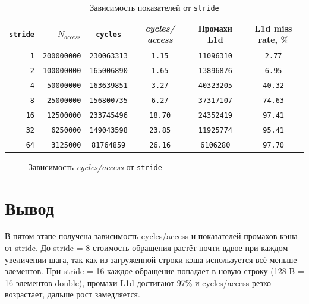 \begin{table}[H]
\caption{Зависимость показателей от \texttt{stride}}
\label{tab:stride}
\small
\begin{tabularx}{\textwidth}{|r|r|C|C|C|C|}
	\hline
	\texttt{stride} & $N_{access}$ & \texttt{cycles} & \textit{cycles/ access} & Промахи L1d & L1d miss rate, \% \\
	\hline
	\texttt{1} & \texttt{200000000} & \texttt{230063313} & \texttt{1.15} & \texttt{11096310} & \texttt{2.77} \\
	\hline
	\texttt{2} & \texttt{100000000} & \texttt{165006890} & \texttt{1.65} & \texttt{13896876} & \texttt{6.95} \\
	\hline
	\texttt{4} & \texttt{50000000} & \texttt{163639851} & \texttt{3.27} & \texttt{40323205} & \texttt{40.32} \\
	\hline
	\texttt{8} & \texttt{25000000} & \texttt{156800735} & \texttt{6.27} & \texttt{37317107} & \texttt{74.63} \\
	\hline
	\texttt{16} & \texttt{12500000} & \texttt{233745496} & \texttt{18.70} & \texttt{24352419} & \texttt{97.41} \\
	\hline
	\texttt{32} & \texttt{6250000} & \texttt{149043598} & \texttt{23.85} & \texttt{11925774} & \texttt{95.41} \\
	\hline
	\texttt{64} & \texttt{3125000} & \texttt{81764859} & \texttt{26.16} & \texttt{6106280} & \texttt{97.70} \\
	\hline
\end{tabularx}
\end{table}

\stridedata
\begin{figure}[H]
	\centering
	\caption{Зависимость \textit{cycles/access} от \texttt{stride}}
	\label{fig:stride-cycles}
\end{figure}

\section{Вывод}

В пятом этапе получена зависимость cycles/access и показателей промахов кэша от stride.
До stride = 8 стоимость обращения растёт почти вдвое при каждом увеличении шага, так как из загруженной строки кэша используется всё меньше элементов.
При stride = 16 каждое обращение попадает в новую строку (128 B = 16 элементов double), промахи L1d достигают 97\% и cycles/access резко возрастает, дальше рост замедляется.
